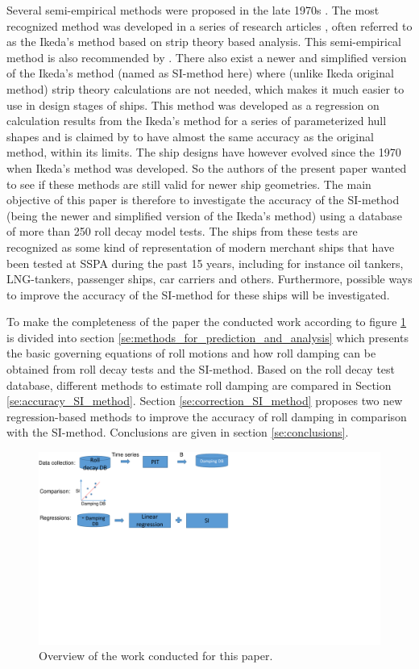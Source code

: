 Several semi-empirical methods were proposed in the late 1970s \parencite{himeno_prediction_1981}. The most recognized method was developed in a series of research articles \parencite{ikeda_roll_1978,ikeda_eddy_1978,ikeda_roll_1979,ikeda_components_1978,ikeda_velocity_1979}, often referred to as the Ikeda's method based on strip theory based analysis. This semi-empirical method is also recommended by \parencite{ittc_ittc_2011}. 
There also exist a newer and simplified version of the Ikeda's method \parencite{kawahara_simple_2011} (named as SI-method here) where (unlike Ikeda original method) strip theory calculations are not needed, which makes it much easier to use in design stages of ships. This method was developed as a regression on calculation results from the Ikeda's method for a series of parameterized hull shapes and is claimed by \parencite{kawahara_simple_2011} to have almost the same accuracy as the original method, within its limits. The ship designs have however evolved since the 1970 when Ikeda's method was developed. So the authors of the present paper wanted to see if these methods are still valid for newer ship geometries. The main objective of this paper is therefore to investigate the accuracy of the SI-method (being the newer and simplified version of the Ikeda's method) using a database of more than 250 roll decay model tests. The ships from these tests are recognized as some kind of representation of modern merchant ships that have been tested at SSPA during the past 15 years, including for instance oil tankers, LNG-tankers, passenger ships, car carriers and others. Furthermore, possible ways to improve the accuracy of the SI-method for these ships will be investigated. 

To make the completeness of the paper the conducted work according to figure \ref{fig:workflow} is divided into  section \ref{se:methods_for_prediction_and_analysis} which presents the basic governing equations of roll motions and how roll damping can be obtained from roll decay tests and the SI-method. 
Based on the roll decay test database, different methods to estimate roll damping are compared in Section \ref{se:accuracy_SI_method}. Section \ref{se:correction_SI_method} proposes two new regression-based methods to improve the accuracy of roll damping in comparison with the SI-method. Conclusions are given in section \ref{se:conclusions}.  

\begin{figure}[H]
    \centering
    \includegraphics[width=0.5\columnwidth]{figures/workflow.pdf}
    \caption{Overview of the work conducted for this paper.}
    \label{fig:workflow}
\end{figure}